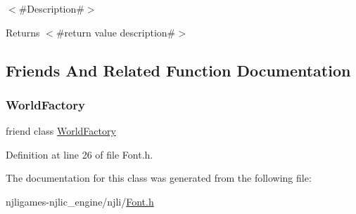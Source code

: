 $<$\#\+Description\#$>$

\begin{DoxyReturn}{Returns}
$<$\#return value description\#$>$ 
\end{DoxyReturn}


\subsection{Friends And Related Function Documentation}
\mbox{\label{classnjli_1_1_font_acb96ebb09abe8f2a37a915a842babfac}} 
\subsubsection{\texorpdfstring{World\+Factory}{WorldFactory}}
{\footnotesize\ttfamily friend class \mbox{\hyperlink{classnjli_1_1_world_factory}{World\+Factory}}\hspace{0.3cm}{\ttfamily [friend]}}



Definition at line 26 of file Font.\+h.



The documentation for this class was generated from the following file\+:\begin{DoxyCompactItemize}
\item 
njligames-\/njlic\+\_\+engine/njli/\mbox{\hyperlink{_font_8h}{Font.\+h}}\end{DoxyCompactItemize}
